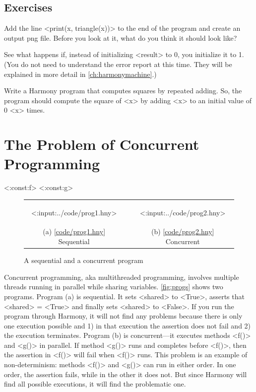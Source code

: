 \documentclass{report}
\newcommand{\harmonylink}[1]{%
[\href{https://harmony.cs.cornell.edu/#1}{\underline{#1}}]%
}
\begin{document}
\section*{Exercises}
\begin{problems}
\item Add the line <{print(x, triangle(x))}> to the end of the
program and create an output png file.  Before you look at it, what
do you think it should look like?
\item See what happens if, instead of initializing <{result}> to 0,
you initialize it to 1.  (You do not need to understand the error report at this time.  They will be explained in more detail in \autoref{ch:harmonymachine}.)
\item Write a Harmony program that computes squares by repeated adding.  So, the program
should compute the square of <{x}> by adding <{x}> to an initial value of 0 <{x}> times.
\end{problems}

\chapter{The Problem of Concurrent Programming}
\label{ch:concurrent}

<{:const:f}>
<{:const:g}>

\begin{figure}[h]
\begin{center}
\begin{tabular}{ccc}
\begin{tcolorbox}[width=0.4\linewidth]
<{:input:../code/prog1.hny}>
\end{tcolorbox}
& \rule{0.05\linewidth}{0in} &
\begin{tcolorbox}[width=0.4\linewidth]
<{:input:../code/prog2.hny}>
\end{tcolorbox}
\\
(a) \harmonylink{code/prog1.hny} Sequential && (b) \harmonylink{code/prog2.hny} Concurrent
\end{tabular}
\end{center}
\caption{A sequential and a concurrent program}
\label{fig:progs}
\end{figure}

%

Concurrent programming, aka multithreaded programming, involves multiple
threads
%
running in parallel while sharing variables.
\autoref{fig:progs} shows two programs.  Program (a) is sequential.
It sets <{shared}> to <{True}>, asserts that
<{shared}> = <{True}> and finally sets <{shared}> to <{False}>.
If you run the program through Harmony, it will not find any problems
because there is only one execution possible and 1) in that execution
the assertion does not fail and 2) the execution terminates.
Program (b) is concurrent---it executes methods <{f()}> and
<{g()}> in parallel.
If method <{g()}> runs and completes before <{f()}>, then
the assertion in <{f()}> will fail when <{f()}> runs.
This problem is an example of non-determinism: methods <{f()}>
and <{g()}> can run in either order.
In one order, the assertion fails, while in the other it does not.
But since Harmony will find all possible executions, it will find
the problematic one.
\end{document}
